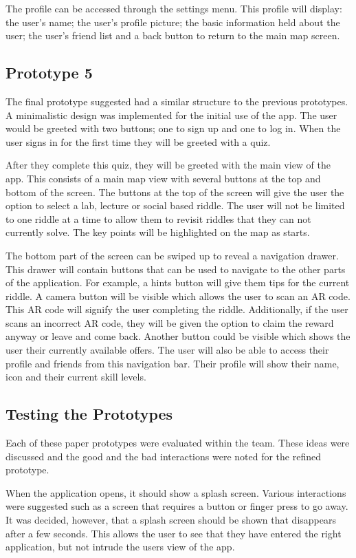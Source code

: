 \documentclass[10pt,twocolumn]{article} %
\begin{document}
The profile can be accessed through the settings menu. This profile will display: the user's name; the user's profile picture; the basic information held about the user; the user's friend list and a back button to return to the main map screen.

\subsection*{Prototype 5}

The final prototype suggested had a similar structure to the previous prototypes. A minimalistic design was implemented for the initial use of the app. The user would be greeted with two buttons; one to sign up and one to log in. When the user signs in for the first time they will be greeted with a quiz.

After they complete this quiz, they will be greeted with the main view of the app. This consists of a main map view with several buttons at the top and bottom of the screen. The buttons at the top of the screen will give the user the option to select a lab, lecture or social based riddle. The user will not be limited to one riddle at a time to allow them to revisit riddles that they can not currently solve. The key points will be highlighted on the map as starts.

The bottom part of the screen can be swiped up to reveal a navigation drawer. This drawer will contain buttons that can be used to navigate to the other parts of the application. For example, a hints button will give them tips for the current riddle. A camera button will be visible which allows the user to scan an AR code. This AR code will signify the user completing the riddle. Additionally, if the user scans an incorrect AR code, they will be given the option to claim the reward anyway or leave and come back. Another button could be visible which shows the user their currently available offers. The user will also be able to access their profile and friends from this navigation bar. Their profile will show their name, icon and their current skill levels.

\subsection*{Testing the Prototypes}
Each of these paper prototypes were evaluated within the team. These ideas were discussed and the good and the bad interactions were noted for the refined prototype.

When the application opens, it should show a splash screen. Various interactions were suggested such as a screen that requires a button or finger press to go away. It was decided, however, that a splash screen should be shown that disappears after a few seconds. This allows the user to see that they have entered the right application, but not intrude the users view of the app.
\end{document}
